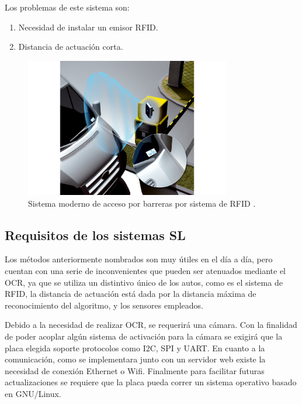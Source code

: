 Los problemas de este sistema son:

\begin{enumerate}
    \item Necesidad de instalar un emisor RFID.
    \item Distancia de actuación corta.
\end{enumerate}

\begin{figure}
    \centering
    \includegraphics[width=0.8\textwidth]{imgs/sistema-control-acceso-barreras-rfid.jpg}
    \caption{Sistema moderno de acceso por barreras por sistema de RFID \cite{noauthor_acceso_nodate}.}
    \label{fig:sistema-moderno}
\end{figure}

\subsection{Requisitos de los sistemas SL}

Los métodos anteriormente nombrados son muy útiles en el día a día, pero cuentan con una serie de inconvenientes que pueden ser atenuados mediante el OCR, ya que se utiliza un distintivo único de los autos, como es el sistema de RFID, la distancia de actuación está dada por la distancia máxima de reconocimiento del algoritmo, y los sensores empleados.

Debido a la necesidad de realizar OCR, se requerirá una cámara. Con la finalidad de poder acoplar algún sistema de activación para la cámara se exigirá que la placa elegida soporte protocolos como I2C, SPI y UART. En cuanto a la comunicación, como se implementara junto con un servidor web existe la necesidad de conexión Ethernet o Wifi. Finalmente para facilitar futuras actualizaciones se requiere que la placa pueda correr un sistema operativo basado en GNU/Linux.

